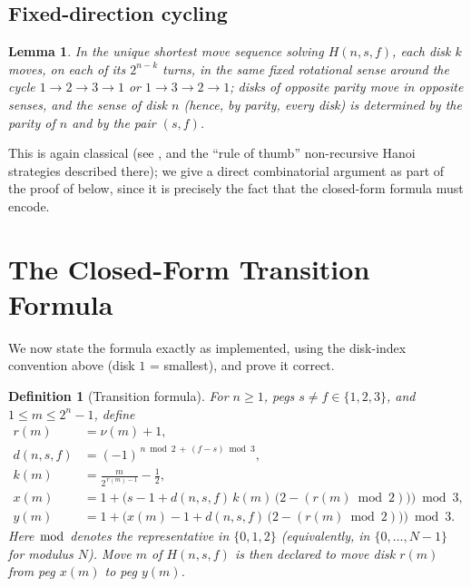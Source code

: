\documentclass[11pt]{article}
\newtheorem{lemma}[theorem]{Lemma}
\newtheorem{definition}[theorem]{Definition}
\begin{document}
\subsection{Fixed-direction cycling}

\begin{lemma}
\label{lem:direction}
In the unique shortest move sequence solving $H(n,s,f)$, each disk $k$
moves, on each of its $2^{n-k}$ turns, in the same fixed rotational sense
around the cycle $1 \to 2 \to 3 \to 1$ or $1 \to 3 \to 2 \to 1$; disks of
opposite parity move in opposite senses, and the sense of disk $n$ (hence,
by parity, every disk) is determined by the parity of $n$ and by the pair
$(s,f)$.
\end{lemma}

This is again classical (see \cite{hinz2018}, and the ``rule of thumb''
non-recursive Hanoi strategies described there); we give a direct
combinatorial argument as part of the proof of  below,
since it is precisely the fact that the closed-form formula must encode.

\section{The Closed-Form Transition Formula}
\label{sec:formula}

We now state the formula exactly as implemented, using the disk-index
convention above (disk $1$ = smallest), and prove it correct.

\begin{definition}[Transition formula]
\label{def:formula}
For $n \ge 1$, pegs $s \ne f \in \{1,2,3\}$, and $1 \le m \le 2^n-1$, define
\begin{align}
  r(m) &= \nu(m) + 1, \label{eq:r}\\
  d(n,s,f) &= (-1)^{\,n \bmod 2 \,+\, (f-s) \bmod 3}, \label{eq:d}\\
  k(m) &= \frac{m}{2^{\,r(m)-1}} - \frac12, \label{eq:k}\\
  x(m) &= 1 + \Big(s - 1 + d(n,s,f)\, k(m) \, \big(2 - (r(m) \bmod 2)\big)\Big) \bmod 3, \label{eq:x}\\
  y(m) &= 1 + \Big(x(m) - 1 + d(n,s,f)\, \big(2 - (r(m) \bmod 2)\big)\Big) \bmod 3. \label{eq:y}
\end{align}
Here $\bmod$ denotes the representative in $\{0,1,2\}$ (equivalently, in
$\{0,\dots,N-1\}$ for modulus $N$). Move $m$ of $H(n,s,f)$ is then declared
to move disk $r(m)$ from peg $x(m)$ to peg $y(m)$.
\end{definition}
\end{document}
